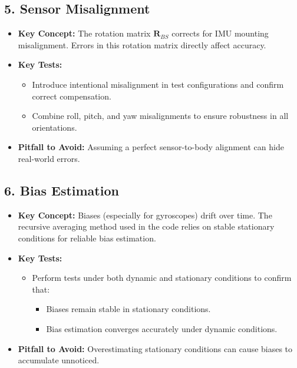 \documentclass{article}
\begin{document}
\subsection*{5. Sensor Misalignment}
\begin{itemize}
	\item \textbf{Key Concept:} The rotation matrix $\mathbf{R}_{BS}$ corrects for IMU mounting misalignment. Errors in this rotation matrix directly affect accuracy.
	\item \textbf{Key Tests:}
	\begin{itemize}
		\item Introduce intentional misalignment in test configurations and confirm correct compensation.
		\item Combine roll, pitch, and yaw misalignments to ensure robustness in all orientations.
	\end{itemize}
	\item \textbf{Pitfall to Avoid:} Assuming a perfect sensor-to-body alignment can hide real-world errors.
\end{itemize}

\subsection*{6. Bias Estimation}
\begin{itemize}
	\item \textbf{Key Concept:} Biases (especially for gyroscopes) drift over time. The recursive averaging method used in the code relies on stable stationary conditions for reliable bias estimation.
	\item \textbf{Key Tests:}
	\begin{itemize}
		\item Perform tests under both dynamic and stationary conditions to confirm that:
		\begin{itemize}
			\item Biases remain stable in stationary conditions.
			\item Bias estimation converges accurately under dynamic conditions.
		\end{itemize}
	\end{itemize}
	\item \textbf{Pitfall to Avoid:} Overestimating stationary conditions can cause biases to accumulate unnoticed.
\end{itemize}
\end{document}
